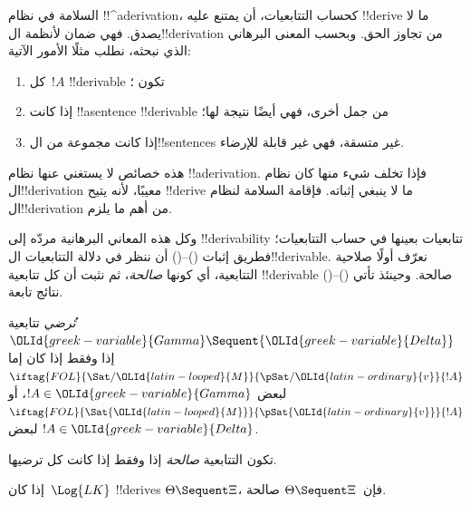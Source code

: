 \documentclass[../../../include/open-logic-section]{subfiles}
\begin{document}
      {}
      {}


\begin{explain}
السلامة في نظام !!^a{derivation}، كحساب التتابعيات، أن يمتنع عليه
!!{derive} ما لا يصدق. فهي ضمان لأنظمة ال!!{derivation} من تجاوز الحق.
وبحسب المعنى البرهاني الذي نبحثه، نطلب مثلًا الأمور الآتية:
\begin{enumerate}
\item كل~$!A$ !!{derivable} تكون ؛
\item إذا كانت !!a{sentence} !!{derivable} من جمل أخرى، فهي أيضًا
  نتيجة لها؛
\item إذا كانت مجموعة من ال!!{sentence}s غير متسقة، فهي غير قابلة
  للإرضاء.
\end{enumerate}
هذه خصائص لا يستغني عنها نظام !!a{derivation}. فإذا تخلف شيء منها كان نظام ال!!{derivation} معيبًا، لأنه يتيح
!!{derive} ما لا ينبغي إثباته. فإقامة السلامة لنظام ال!!{derivation} من أهم ما يلزم.

وكل هذه المعاني البرهانية مردّه إلى
!!{derivability} تتابعيات بعينها في حساب التتابعيات؛ فطريق إثبات
()--() أن ننظر في دلالة التتابعيات ال!!{derivable}.
نعرّف أولًا صلاحية التتابعية، أي كونها \emph{صالحة}، ثم نثبت أن كل تتابعية
!!{derivable} صالحة. وحينئذ تأتي ()--() نتائج تابعة.
\end{explain}

\begin{defn}
 \emph{تُرضي} تتابعية
${\OLId{greek-variable}{Gamma}} \Sequent {\OLId{greek-variable}{Delta}}$ إذا وفقط إذا كان إما
$\iftag{FOL}{\Sat/{{\OLId{latin-looped}{M}}}}{\pSat/{{\OLId{latin-ordinary}{v}}}}{!A}$ لبعض $!A \in {\OLId{greek-variable}{Gamma}}$، أو
$\iftag{FOL}{\Sat{{\OLId{latin-looped}{M}}}}{\pSat{{\OLId{latin-ordinary}{v}}}}{!A}$ لبعض $!A \in {\OLId{greek-variable}{Delta}}$.

تكون التتابعية \emph{صالحة} إذا وفقط إذا كانت كل
ترضيها.
\end{defn}

\begin{thm}[السلامة]
 إذا كان~$\Log{LK}$ !!{derive}s
$\Theta \Sequent \Xi$، فإن~$\Theta \Sequent \Xi$ صالحة.
\end{thm}
\end{document}
